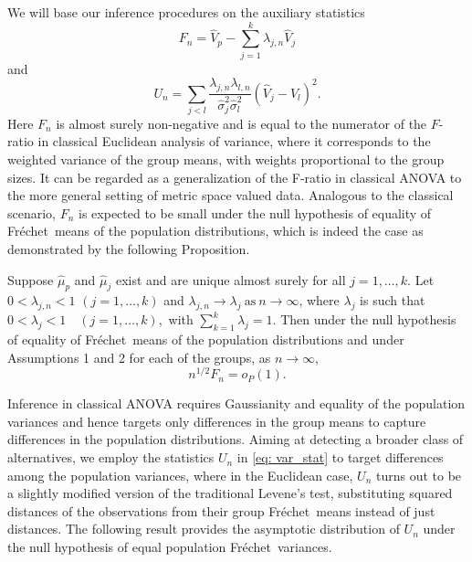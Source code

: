 \documentclass[lineno]{biometrika}
\def\F{Fr\'{e}chet}
\begin{document}
We  will base our inference procedures on the auxiliary statistics
\begin{equation}
\label{eq: factor}
F_n= \hat{V}_p-\sum_{j=1}^{k}\lambda_{j,n} \hat{V}_j
\end{equation}
and 
\begin{equation}
\label{eq: var_stat}
U_n=  \sum_{j < l} \frac{\lambda_{j,n}\lambda_{l,n}}{\hat{\sigma}_j^2 \hat{\sigma}_l^2} (\hat{V}_j-\hat{V}_l)^2.
\end{equation}
Here $F_n$ is almost surely non-negative and is equal to the  numerator of the $F$-ratio in classical Euclidean analysis of variance,  where it corresponds to the weighted variance of the group means, with weights proportional to the group sizes.  %
It can be regarded as a generalization of the F-ratio in classical ANOVA to the more general setting of metric space valued data. Analogous to the classical scenario, $F_n$ is expected to be small under the null hypothesis of equality of \F \ means of the population distributions, which is indeed the case as demonstrated by the following Proposition.
\begin{proposition}
	\label{lma: f-ratio}
	Suppose $\hat{\mu}_p$ and  $\hat{\mu}_j$ exist and are unique almost surely for all $j=1,\ldots,k$. Let $0  < \lambda_{j,n} < 1 \,\, (j=1,\dots,k)$ and $\lambda_{j,n} \rightarrow \lambda_j \ \text{as} \ n \rightarrow \infty$, where $\lambda_j$ is such that $0 < \lambda_j < 1 \quad (j=1,\dots,k),$ with $\sum_{k=1}^k \lambda_j =1.$ Then under the null hypothesis of equality of \F \ means of the population distributions and under Assumptions 1 and 2 for each of the groups, as $n \rightarrow \infty$, 
	\begin{equation}
	\label{eq: f-ratio}
	n^{1/2} F_n=o_P(1).
	\end{equation}
\end{proposition}
Inference in classical ANOVA requires Gaussianity and 
equality of the population variances and hence targets  only differences in the group means 
to capture differences in the population distributions. %
Aiming at detecting a broader class of alternatives, we  employ the statistics 
$U_n$ in \eqref{eq: var_stat} to target differences among the population variances, where in 
the Euclidean case,  $U_n$ turns out to be a slightly modified version of the traditional Levene's test, substituting squared distances of the observations from their group \F \ means instead of just distances. The following result provides the asymptotic distribution of $U_n$ under the null hypothesis of equal population \F \ variances.
\end{document}
